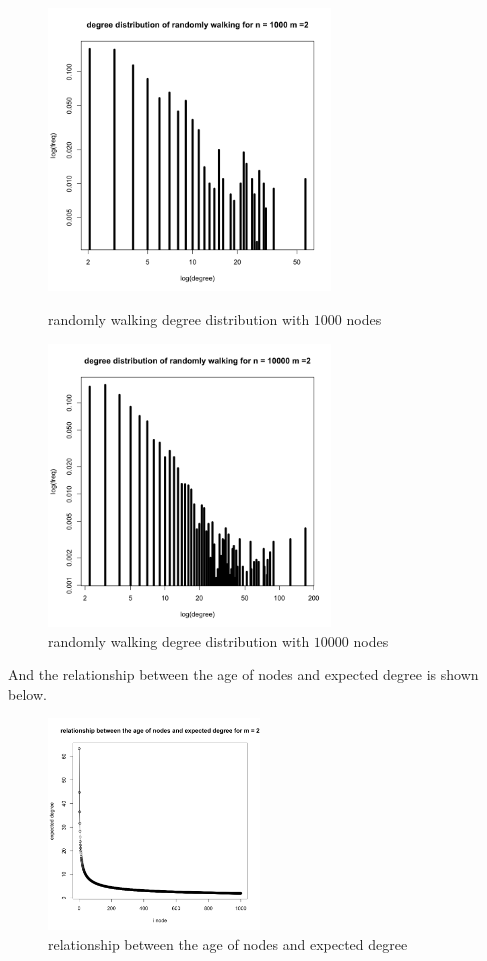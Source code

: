 \documentclass[draftcls,12pt,onecolumn]{IEEEtran}
\begin{document}
\begin{figure}[htbp]
\centering
\begin{minipage}[t]{0.48\textwidth}
\centering
\includegraphics[width=7.5cm]{img/2_g_1_degree3}
\caption{randomly walking degree distribution with $1000$ nodes}
\end{minipage}
\begin{minipage}[t]{0.48\textwidth}
\centering
\includegraphics[width=7.5cm]{img/2_g_1_degree4}
\caption{randomly walking degree distribution with $10000$ nodes}
\end{minipage}
\end{figure}

And the relationship between the age of nodes and expected degree is shown below.

\begin{figure}[h]
\centering
\includegraphics[width=0.5\textwidth]{img/2_g_1_relat}
\caption{relationship between the age of nodes and expected degree}
\end{figure}
\end{document}
